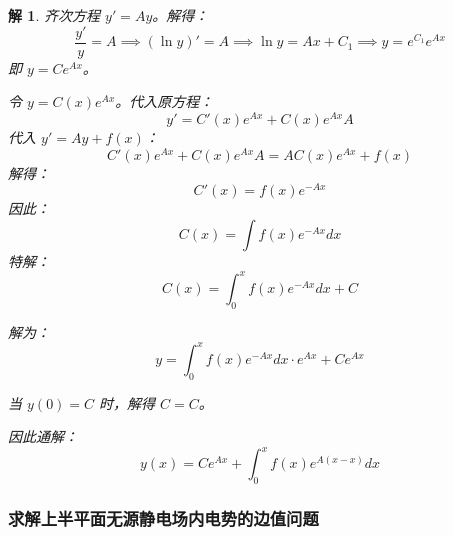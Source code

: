 \documentclass[12pt,a4paper]{article}
\numberwithin{subsection}{section}   %
\numberwithin{subsubsection}{subsection}
\theoremstyle{plain}
\newtheorem{solution}{解}[subsection]  %
\theoremstyle{definition}
\theoremstyle{remark}
\theoremstyle{remark}
\begin{document}
\begin{solution}
齐次方程 $y' = A y$。解得：
\begin{equation}
	\frac{y'}{y} = A \implies (\ln y)' = A \implies \ln y = A x + C_1 \implies y = e^{C_1} e^{A x}
\end{equation}
即 $y = C e^{A x}$。

 令 $y = C(x) e^{A x}$。代入原方程：
\begin{equation}
	y' = C'(x) e^{A x} + C(x) e^{A x} A
\end{equation}
代入 $y' = A y + f(x)$：
\begin{equation}
	C'(x) e^{A x} + C(x) e^{A x} A = A C(x) e^{A x} + f(x)
\end{equation}
解得：
\begin{equation}
	C'(x) = f(x) e^{-A x}
\end{equation}
因此：
\begin{equation}
	C(x) = \int f(x) e^{-A x} dx
\end{equation}
特解：
\begin{equation}
	C(x) = \int_0^x f(x) e^{-A x} dx + C
\end{equation}

解为：
\begin{equation}
	y = \int_0^x f(x) e^{-A x} dx \cdot e^{A x} + C e^{A x}
\end{equation}

当 $y(0) = C$ 时，解得 $C = C$。

因此通解：
\begin{equation}
	y(x) = C e^{A x} + \int_0^x f(x) e^{A (x - x)} dx
\end{equation}


\subsubsection{求解上半平面无源静电场内电势的边值问题}
\end{solution}
\end{document}
